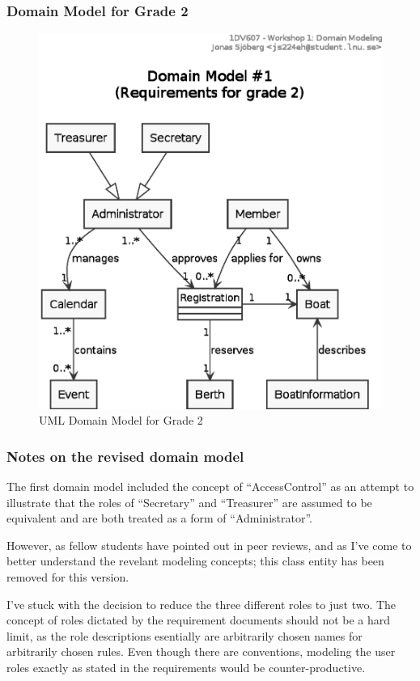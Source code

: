 \subsubsection{Domain Model for Grade 2}
\begin{figure}[htbp]
  \centering
  \includegraphics[width=\linewidth]{uml/domain-model_1.eps}
  \caption{UML Domain Model for Grade 2}
  \label{fig:uml-domain1}
\end{figure}

\subsubsection{Notes on the revised domain model}
The first domain model included the concept of ``AccessControl'' as an attempt
to illustrate that the roles of ``Secretary'' and ``Treasurer'' are assumed to
be equivalent and are both treated as a form of ``Administrator''.

However, as fellow students have pointed out in peer reviews, and as I've come
to better understand the revelant modeling concepts; this class entity has been
removed for this version.

I've stuck with the decision to reduce the three different roles to just two.
The concept of roles dictated by the requirement documents should not be a hard
limit, as the role descriptions esentially are arbitrarily chosen names for
arbitrarily chosen rules. Even though there are conventions, modeling the user
roles exactly as stated in the requirements would be counter-productive.

